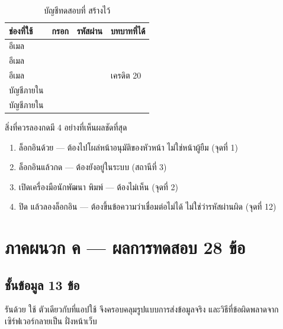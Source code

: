 \begin{table}[htbp]
\centering
\footnotesize\sansall
\caption{บัญชีทดสอบที่  สร้างไว้}
\label{tab:accounts}
\begin{tabular}{@{}L{2.6cm}L{3.8cm}L{2.8cm}L{3.4cm}@{}}
\toprule
\textbf{ช่องที่ใช้} & \textbf{กรอก} & \textbf{รหัสผ่าน} & \textbf{บทบาทที่ได้} \\
\midrule
อีเมล  &  &  &  \\
อีเมล  &  &  & \textbf{} \\
อีเมล  &  &  &  เครดิต 20 \\
บัญชีภายใน &  &  &  \\
บัญชีภายใน &  &  &  \\
\bottomrule
\end{tabular}
\end{table}

สิ่งที่ควรลองกดมี 4 อย่างที่เห็นผลชัดที่สุด

\begin{enumerate}
  \item ล็อกอินด้วย  --- ต้องไปโผล่หน้าอนุมัติของหัวหน้า
        ไม่ใช่หน้าผู้ยืม (จุดที่ 1)
  \item ล็อกอินแล้วกด  --- ต้องยังอยู่ในระบบ (สถานีที่ 3)
  \item เปิดเครื่องมือนักพัฒนา พิมพ์  --- ต้องไม่เห็น
         (จุดที่ 2)
  \item ปิด  แล้วลองล็อกอิน --- ต้องขึ้นข้อความว่าเชื่อมต่อไม่ได้
        ไม่ใช่ว่ารหัสผ่านผิด (จุดที่ 12)
\end{enumerate}

\section*{ภาคผนวก ค --- ผลการทดสอบ 28 ข้อ}

\subsection*{ชั้นข้อมูล 13 ข้อ}

รันด้วย 
ใช้  ตัวเดียวกับที่แอปใช้ จึงครอบคลุมรูปแบบการส่งข้อมูลจริง
และวิธีที่ข้อผิดพลาดจากเซิร์ฟเวอร์กลายเป็น  ฝั่งหน้าเว็บ

